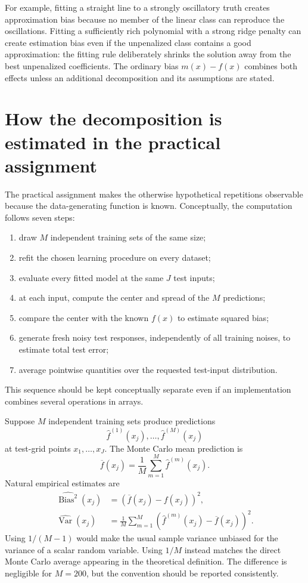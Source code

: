 \documentclass[11pt,a4paper]{article}
\begin{document}
For example, fitting a straight line to a strongly oscillatory truth creates approximation bias because no member of the linear class can reproduce the oscillations. Fitting a sufficiently rich polynomial with a strong ridge penalty can create estimation bias even if the unpenalized class contains a good approximation: the fitting rule deliberately shrinks the solution away from the best unpenalized coefficients. The ordinary bias $m(x)-f(x)$ combines both effects unless an additional decomposition and its assumptions are stated.

\section{How the decomposition is estimated in the practical assignment}
\label{sec:monte-carlo}

The practical assignment makes the otherwise hypothetical repetitions observable because the data-generating function is known. Conceptually, the computation follows seven steps:
\begin{enumerate}
  \item draw $M$ independent training sets of the same size;
  \item refit the chosen learning procedure on every dataset;
  \item evaluate every fitted model at the same $J$ test inputs;
  \item at each input, compute the center and spread of the $M$ predictions;
  \item compare the center with the known $f(x)$ to estimate squared bias;
  \item generate fresh noisy test responses, independently of all training noises, to estimate total test error;
  \item average pointwise quantities over the requested test-input distribution.
\end{enumerate}
This sequence should be kept conceptually separate even if an implementation combines several operations in arrays.

Suppose $M$ independent training sets produce predictions
\begin{equation}
  \widehat f^{(1)}(x_j),\ldots,\widehat f^{(M)}(x_j)
\end{equation}
at test-grid points $x_1,\ldots,x_J$. The Monte Carlo mean prediction is
\begin{equation}
  \overline f(x_j)=\frac{1}{M}\sum_{m=1}^{M}\widehat f^{(m)}(x_j).
\end{equation}
Natural empirical estimates are
\begin{align}
  \widehat{\operatorname{Bias}^2}(x_j)
  &=\left(\overline f(x_j)-f(x_j)\right)^2,\\
  \widehat{\operatorname{Var}}(x_j)
  &=\frac{1}{M}\sum_{m=1}^{M}
    \left(\widehat f^{(m)}(x_j)-\overline f(x_j)\right)^2.
  \label{eq:mcvar}
\end{align}
Using $1/(M-1)$ would make the usual sample variance unbiased for the variance of a scalar random variable. Using $1/M$ instead matches the direct Monte Carlo average appearing in the theoretical definition. The difference is negligible for $M=200$, but the convention should be reported consistently.
\end{document}
